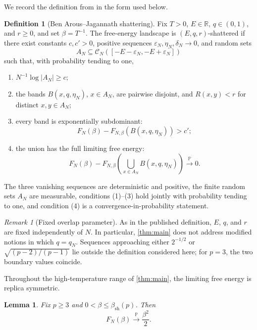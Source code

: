 \documentclass[11pt,reqno]{amsart}
\numberwithin{equation}{section}
\theoremstyle{plain}
\newtheorem{lemma}[lemma]{Lemma}
\theoremstyle{definition}
\newtheorem{definition}[definition]{Definition}
\theoremstyle{remark}
\newtheorem{remark}[remark]{Remark}
\newcommand{\Pp}{\mathbb P}
\newcommand{\R}{\mathbb R}
\newcommand{\1}{\mathbf 1}
\newcommand{\eps}{\varepsilon}
\newcommand{\cN}{\mathcal C_N}
\begin{document}
We record the definition from \cite{BenArousJagannath2024} in the form used below.

\begin{definition}[Ben Arous--Jagannath shattering]\label{def:shattering}
Fix \(T>0\), \(E\in\R\), \(q\in(0,1)\), and \(r\geq0\), and set \(\beta=T^{-1}\).  The free-energy landscape is \((E,q,r)\)-shattered if there exist constants \(c,c'>0\), positive sequences \(\eps_N,\eta_N,\delta_N\to0\), and random sets
\[
 A_N\subseteq \cN([-E-\eps_N,-E+\eps_N])
\]
such that, with probability tending to one,
\begin{enumerate}[label=\textup{(\arabic*)},leftmargin=2.2em]
 \item \(N^{-1}\log\lvert A_N\rvert\geq c\);
 \item the bands \(B(x,q,\eta_N)\), \(x\in A_N\), are pairwise disjoint, and \(R(x,y)<r\) for distinct \(x,y\in A_N\);
 \item every band is exponentially subdominant:
 \[
 F_N(\beta)-F_{N,\beta}(B(x,q,\eta_N))>c';
 \]
 \item the union has the full limiting free energy:
 \[
 F_N(\beta)-F_{N,\beta}\left(\bigcup_{x\in A_N}B(x,q,\eta_N)\right)\xrightarrow{\Pp}0.
 \]
\end{enumerate}
The three vanishing sequences are deterministic and positive, the finite random sets \(A_N\) are measurable, conditions \textup{(1)}--\textup{(3)} hold jointly with probability tending to one, and condition \textup{(4)} is a convergence-in-probability statement.
\end{definition}

\begin{remark}[Fixed overlap parameter]\label{rem:fixedq}
As in the published definition, \(E\), \(q\), and \(r\) are fixed
independently of \(N\).  In particular, \cref{thm:main} does not address
modified notions in which \(q=q_N\).  Sequences approaching either
\(2^{-1/2}\) or \(\sqrt{(p-2)/(p-1)}\) lie outside the definition
considered here; for \(p=3\), the two boundary values coincide.
\end{remark}

Throughout the high-temperature range of \cref{thm:main}, the limiting
free energy is replica symmetric.

\begin{lemma}\label{lem:fullFE}
Fix \(p\geq3\) and \(0<\beta\leq\beta_{\mathrm{sh}}(p)\).  Then
\begin{equation}\label{eq:fullFE}
 F_N(\beta)\xrightarrow{\Pp}\frac{\beta^2}{2}.
\end{equation}
\end{lemma}
\end{document}
